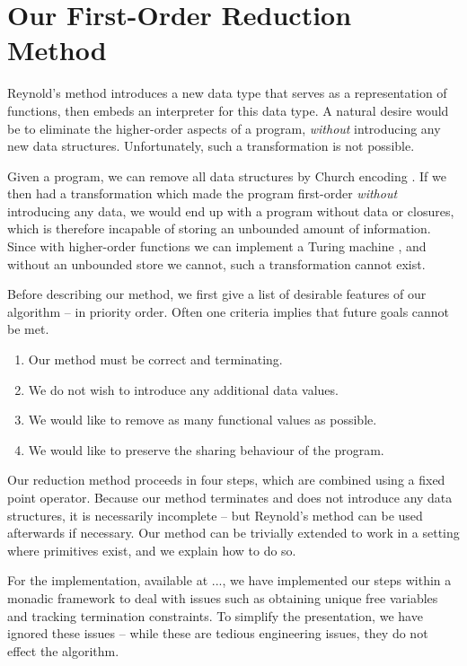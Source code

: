 \documentclass[preprint]{sigplanconf}
\let\cite=\citep
\begin{document}
\section{Our First-Order Reduction Method}

Reynold's method introduces a new data type that serves as a representation of functions, then embeds an interpreter for this data type. A natural desire would be to eliminate the higher-order aspects of a program, \textit{without} introducing any new data structures. Unfortunately, such a transformation is not possible.

Given a program, we can remove all data structures by Church encoding \cite{church_encode}. If we then had a transformation which made the program first-order \textit{without} introducing any data, we would end up with a program without data or closures, which is therefore incapable of storing an unbounded amount of information. Since with higher-order functions we can implement a Turing machine \cite{turing:halting}, and without an unbounded store we cannot, such a transformation cannot exist.

Before describing our method, we first give a list of desirable features of our algorithm -- in priority order. Often one criteria implies that future goals cannot be met.

\begin{enumerate}
\item Our method must be correct and terminating.
\item We do not wish to introduce any additional data values.
\item We would like to remove as many functional values as possible.
\item We would like to preserve the sharing behaviour of the program.
\end{enumerate}

Our reduction method proceeds in four steps, which are combined using a fixed point operator. Because our method terminates and does not introduce any data structures, it is necessarily incomplete -- but Reynold's method can be used afterwards if necessary. Our method can be trivially extended to work in a setting where primitives exist, and we explain how to do so.

For the implementation, available at ..., we have implemented our steps within a monadic framework to deal with issues such as obtaining unique free variables and tracking termination constraints. To simplify the presentation, we have ignored these issues -- while these are tedious engineering issues, they do not effect the algorithm.
\end{document}
